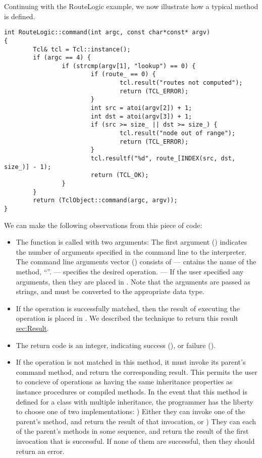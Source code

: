 \documentclass{article}
\begin{document}
Continuing with the RouteLogic example, we now illustrate how a typical
 method is defined.
\begin{verbatim}
int RouteLogic::command(int argc, const char*const* argv)
{
        Tcl& tcl = Tcl::instance();
        if (argc == 4) {
                if (strcmp(argv[1], "lookup") == 0) {
                        if (route_ == 0) {
                                tcl.result("routes not computed");
                                return (TCL_ERROR);
                        }
                        int src = atoi(argv[2]) + 1;
                        int dst = atoi(argv[3]) + 1;
                        if (src >= size_ || dst >= size_) {
                                tcl.result("node out of range");
                                return (TCL_ERROR);
                        }
                        tcl.resultf("%d", route_[INDEX(src, dst, size_)] - 1);
                        return (TCL_OK);
                }
        }
        return (TclObject::command(argc, argv));
}
\end{verbatim}
We can make the following observations from this piece of code:
\begin{itemize}
\item The function is called with two arguments:
  \subitem The first argument ()
  indicates the number of arguments specified
  in the command line to the interpreter.
  \subitem The command line arguments vector () consists of
  \subitem ---  cntains the name of the method, ``''.
  \subitem ---  specifies the desired operation.
  \subitem --- If the user specified any arguments, then they are placed in
  .
  \subitem Note that the arguments are passed as strings, and must be
  converted to the appropriate data type.
\item If the operation is successfully matched, then the result of
  executing the operation is placed in .
  We described the technique to return this result
  \hyperref{earlier}{earlier in Section}{}{sec:Result}.
\item The return code is an integer, indicating success (),
  or failure ().
\item If the operation is not matched in this method, it must
  invoke its parent's command method, and return the corresponding result.
  This permits the user to concieve of operations as having the same
  inheritance properties as instance procedures or compiled methods.
  \subitem In the event that this  method 
  is defined for a class with multiple inheritance, the programmer has the
  liberty to choose one of two implementations:
  ) Either they can invoke one of the parent's 
  method, and return the result of that invocation, or
  ) They can each of the parent's  methods
  in some sequence, and return the result of the first invocation that
  is successful.  If none of them are successful, then they should return
  an error.
\end{itemize}
\end{document}
